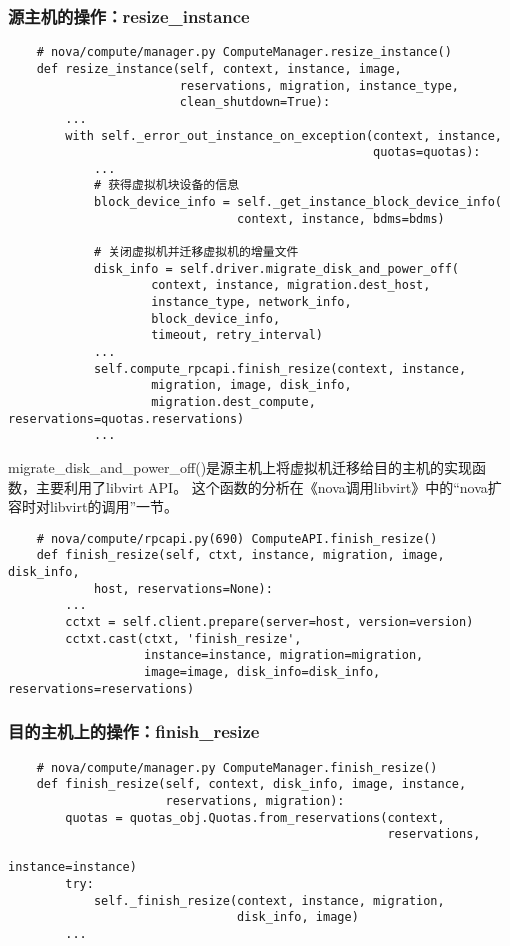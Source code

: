 \documentclass[a4paper,left=1.5cm,right=1.5cm,11pt]{article}
\begin{document}
\subsubsection{源主机的操作：resize\_instance}
	\begin{lstlisting}
	# nova/compute/manager.py ComputeManager.resize_instance()
	def resize_instance(self, context, instance, image,
                        reservations, migration, instance_type,
                        clean_shutdown=True):
		...
        with self._error_out_instance_on_exception(context, instance,
                                                   quotas=quotas):
			...
			# 获得虚拟机块设备的信息
			block_device_info = self._get_instance_block_device_info(
                                context, instance, bdms=bdms)
			
			# 关闭虚拟机并迁移虚拟机的增量文件
            disk_info = self.driver.migrate_disk_and_power_off(
                    context, instance, migration.dest_host,
                    instance_type, network_info,
                    block_device_info,
                    timeout, retry_interval)
			...
            self.compute_rpcapi.finish_resize(context, instance,
                    migration, image, disk_info,
                    migration.dest_compute, reservations=quotas.reservations)
            ...
	\end{lstlisting}

	migrate\_disk\_and\_power\_off()是源主机上将虚拟机迁移给目的主机的实现函数，主要利用了libvirt API。
	这个函数的分析在《nova调用libvirt》中的“nova扩容时对libvirt的调用”一节。

	\begin{lstlisting}
	# nova/compute/rpcapi.py(690) ComputeAPI.finish_resize()
	def finish_resize(self, ctxt, instance, migration, image, disk_info,
            host, reservations=None):
		...
        cctxt = self.client.prepare(server=host, version=version)
        cctxt.cast(ctxt, 'finish_resize',
                   instance=instance, migration=migration,
                   image=image, disk_info=disk_info, reservations=reservations)
	\end{lstlisting}

\subsubsection{目的主机上的操作：finish\_resize}
	\begin{lstlisting}
	# nova/compute/manager.py ComputeManager.finish_resize()
	def finish_resize(self, context, disk_info, image, instance,
                      reservations, migration):
        quotas = quotas_obj.Quotas.from_reservations(context,
                                                     reservations,
                                                     instance=instance)
        try:
            self._finish_resize(context, instance, migration,
                                disk_info, image)
        ...
	\end{lstlisting}
\end{document}
